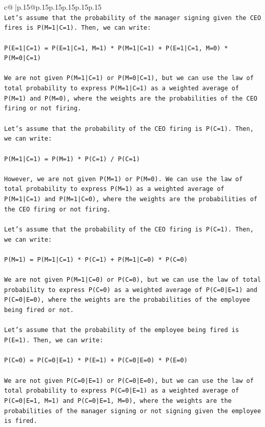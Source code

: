 \documentclass{article}
\begin{document}
{\begin{supertabular}{c@{$\;$}|p{.15\linewidth}@{}p{.15\linewidth}p{.15\linewidth}p{.15\linewidth}p{.15\linewidth}p{.15\linewidth}}
{{{\\ 
\texttt{Let's assume that the probability of the manager signing given the CEO fires is P(M=1|C=1). Then, we can write:} \\
\\ 
\texttt{P(E=1|C=1) = P(E=1|C=1, M=1) * P(M=1|C=1) + P(E=1|C=1, M=0) * P(M=0|C=1)} \\
\\ 
\texttt{We are not given P(M=1|C=1) or P(M=0|C=1), but we can use the law of total probability to express P(M=1|C=1) as a weighted average of P(M=1) and P(M=0), where the weights are the probabilities of the CEO firing or not firing.} \\
\\ 
\texttt{Let's assume that the probability of the CEO firing is P(C=1). Then, we can write:} \\
\\ 
\texttt{P(M=1|C=1) = P(M=1) * P(C=1) / P(C=1)} \\
\\ 
\texttt{However, we are not given P(M=1) or P(M=0). We can use the law of total probability to express P(M=1) as a weighted average of P(M=1|C=1) and P(M=1|C=0), where the weights are the probabilities of the CEO firing or not firing.} \\
\\ 
\texttt{Let's assume that the probability of the CEO firing is P(C=1). Then, we can write:} \\
\\ 
\texttt{P(M=1) = P(M=1|C=1) * P(C=1) + P(M=1|C=0) * P(C=0)} \\
\\ 
\texttt{We are not given P(M=1|C=0) or P(C=0), but we can use the law of total probability to express P(C=0) as a weighted average of P(C=0|E=1) and P(C=0|E=0), where the weights are the probabilities of the employee being fired or not.} \\
\\ 
\texttt{Let's assume that the probability of the employee being fired is P(E=1). Then, we can write:} \\
\\ 
\texttt{P(C=0) = P(C=0|E=1) * P(E=1) + P(C=0|E=0) * P(E=0)} \\
\\ 
\texttt{We are not given P(C=0|E=1) or P(C=0|E=0), but we can use the law of total probability to express P(C=0|E=1) as a weighted average of P(C=0|E=1, M=1) and P(C=0|E=1, M=0), where the weights are the probabilities of the manager signing or not signing given the employee is fired.} \\
}}}
\end{supertabular}}
\end{document}
